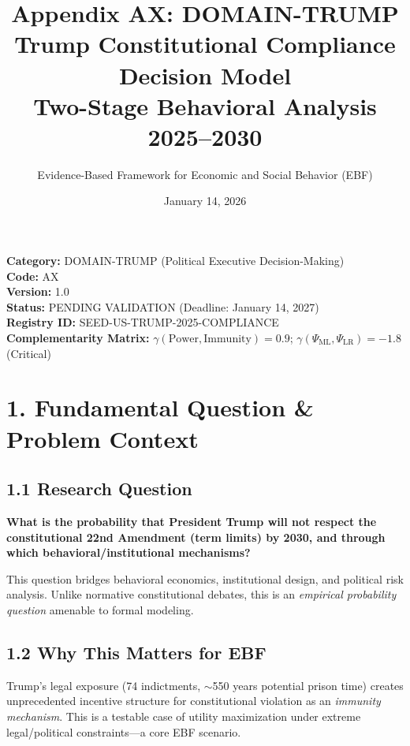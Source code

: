 \documentclass[11pt]{article}
\title{\textbf{Appendix AX: DOMAIN-TRUMP} \\ Trump Constitutional Compliance Decision Model \\ Two-Stage Behavioral Analysis 2025--2030}
\author{Evidence-Based Framework for Economic and Social Behavior (EBF)}
\date{January 14, 2026}
\begin{document}
\maketitle

\begin{center}
\colorbox{yellow!20}{\begin{minipage}{0.95\textwidth}
\textbf{Category:} DOMAIN-TRUMP (Political Executive Decision-Making) \\
\textbf{Code:} AX \\
\textbf{Version:} 1.0 \\
\textbf{Status:} PENDING VALIDATION (Deadline: January 14, 2027) \\
\textbf{Registry ID:} SEED-US-TRUMP-2025-COMPLIANCE \\
\textbf{Complementarity Matrix:} $\gamma(\text{Power}, \text{Immunity}) = 0.9$; $\gamma(\Psi_{\text{ML}}, \Psi_{\text{LR}}) = -1.8$ (Critical)
\end{minipage}}
\end{center}

\section{1. Fundamental Question \& Problem Context}

\subsection{1.1 Research Question}

\begin{fancybox}
\textbf{What is the probability that President Trump will not respect the constitutional 22nd Amendment (term limits) by 2030, and through which behavioral/institutional mechanisms?}
\end{fancybox}

This question bridges behavioral economics, institutional design, and political risk analysis. Unlike normative constitutional debates, this is an \textit{empirical probability question} amenable to formal modeling.

\subsection{1.2 Why This Matters for EBF}

Trump's legal exposure (74 indictments, $\sim$550 years potential prison time) creates unprecedented incentive structure for constitutional violation as an \textit{immunity mechanism}. This is a testable case of utility maximization under extreme legal/political constraints—a core EBF scenario.
\end{document}
